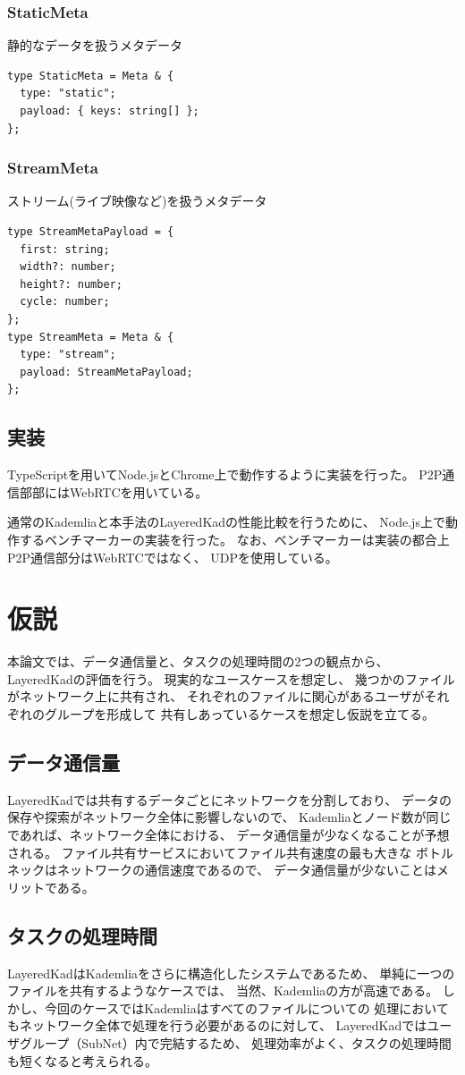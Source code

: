\documentclass[sotsuron]{jcsie}
\begin{document}
\subsection{StaticMeta}
静的なデータを扱うメタデータ
\begin{lstlisting}
type StaticMeta = Meta & {
  type: "static";
  payload: { keys: string[] };
};
\end{lstlisting}
\subsection{StreamMeta}
ストリーム(ライブ映像など)を扱うメタデータ
\begin{lstlisting}
type StreamMetaPayload = {
  first: string;
  width?: number;
  height?: number;
  cycle: number;
};	
type StreamMeta = Meta & {
  type: "stream";
  payload: StreamMetaPayload;
};  
\end{lstlisting}

\section{実装}
TypeScriptを用いてNode.jsとChrome上で動作するように実装を行った。
P2P通信部部にはWebRTCを用いている。

通常のKademliaと本手法のLayeredKadの性能比較を行うために、
Node.js上で動作するベンチマーカーの実装を行った。
なお、ベンチマーカーは実装の都合上P2P通信部分はWebRTCではなく、
UDPを使用している。

\chapter{仮説}
本論文では、データ通信量と、タスクの処理時間の2つの観点から、
LayeredKadの評価を行う。
現実的なユースケースを想定し、
幾つかのファイルがネットワーク上に共有され、
それぞれのファイルに関心があるユーザがそれぞれのグループを形成して
共有しあっているケースを想定し仮説を立てる。
\section{データ通信量}
LayeredKadでは共有するデータごとにネットワークを分割しており、
データの保存や探索がネットワーク全体に影響しないので、
Kademliaとノード数が同じであれば、ネットワーク全体における、
データ通信量が少なくなることが予想される。
ファイル共有サービスにおいてファイル共有速度の最も大きな
ボトルネックはネットワークの通信速度であるので、
データ通信量が少ないことはメリットである。
\section{タスクの処理時間}
LayeredKadはKademliaをさらに構造化したシステムであるため、
単純に一つのファイルを共有するようなケースでは、
当然、Kademliaの方が高速である。
しかし、今回のケースではKademliaはすべてのファイルについての
処理においてもネットワーク全体で処理を行う必要があるのに対して、
LayeredKadではユーザグループ（SubNet）内で完結するため、
処理効率がよく、タスクの処理時間も短くなると考えられる。
\end{document}
